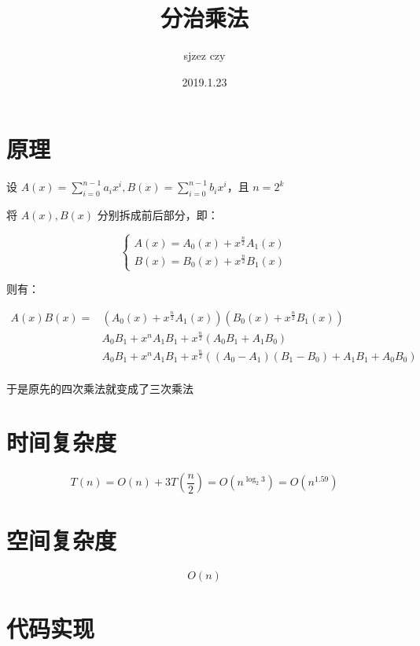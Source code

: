 \documentclass[UTF8]{article}
\author {sjzez czy}
\title {分治乘法}
\date{2019.1.23}
\begin{document}
\maketitle

\tableofcontents

\newpage

    \section{原理}

    设 $A(x)=\sum_{i=0}^{n-1}a_ix^i,B(x)=\sum_{i=0}^{n-1}b_ix^i$，且 $n=2^k$

    将 $A(x),B(x)$ 分别拆成前后部分，即：

    $$
    \begin{cases}
    A(x)=A_0(x)+x^{\frac{n}{2}}A_1(x) \\
    B(x)=B_0(x)+x^{\frac{n}{2}}B_1(x)
    \end{cases}
    $$

    则有：

    $$
    \begin{aligned}
    A(x)B(x)=&\left(A_0(x)+x^{\frac{n}{2}}A_1(x)\right)\left(B_0(x)+x^{\frac{n}{2}}B_1(x)\right) \\
             &A_0B_1+x^nA_1B_1+x^{\frac{n}{2}}\left(A_0B_1+A_1B_0\right) \\
             &A_0B_1+x^nA_1B_1+x^{\frac{n}{2}}\left( \left( A_0-A_1 \right) \left( B_1-B_0 \right) + A_1B_1 + A_0B_0  \right) \\
    \end{aligned}
    $$

    于是原先的四次乘法就变成了三次乘法

    \section{时间复杂度}

    $$
    T(n)=O(n)+3T(\frac{n}{2})=O(n^{\log_2 3})=O(n^{1.59})
    $$

    \section{空间复杂度}

    $$
    O(n)
    $$

    \section{代码实现}
\end{document}
